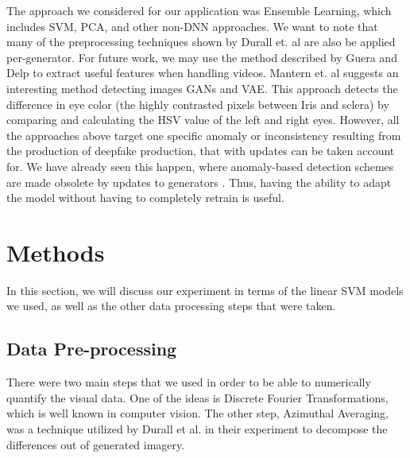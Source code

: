 \documentclass[11pt,twocolumn,letterpaper]{article}
\begin{document}
The approach we considered for our application was Ensemble Learning, which includes SVM, PCA, and other non-DNN approaches. We want to note that many of the preprocessing techniques shown by Durall et. al \cite{durall2019unmasking} are also be applied per-generator. For future work, we may use the method described by Guera and Delp \cite{Guera2018DeepfakeVD} to extract useful features when handling videos. Mantern et. al \cite{Matern2019ExploitingVA} suggests an interesting method detecting images GANs and VAE. This approach detects the difference in eye color (the highly contrasted pixels between Iris and sclera) by comparing and calculating the HSV value of the left and right eyes. However, all the approaches above target one specific anomaly or inconsistency resulting from the production of deepfake production, that with updates can be taken account for. We have already seen this happen, where anomaly-based detection schemes are made obsolete by updates to generators \cite{neekhara2020adversarial}. Thus, having the ability to adapt the model without having to completely retrain is useful.

\section{Methods}
In this section, we will discuss our experiment in terms of the linear SVM models we used, as well as the other data processing steps that were taken.

\subsection{Data Pre-processing}
There were two main steps that we used in order to be able to numerically quantify the visual data. One of the ideas is Discrete Fourier Transformations, which is well known in computer vision. The other step, Azimuthal Averaging, was a technique utilized by Durall et al. in their experiment to decompose the differences out of generated imagery. \cite{durall2019unmasking}
\end{document}
